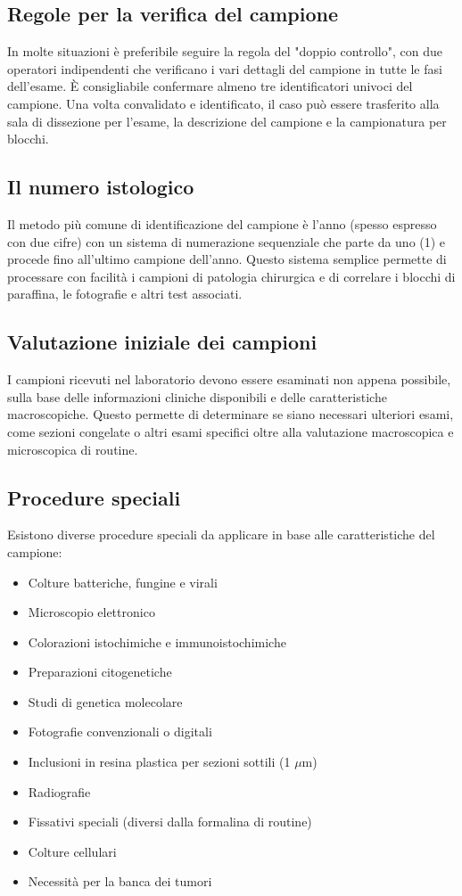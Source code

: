 \subsection{Regole per la verifica del campione}
In molte situazioni è preferibile seguire la regola del "doppio controllo", con due operatori indipendenti che verificano i vari dettagli del campione in tutte le fasi dell'esame. È consigliabile confermare almeno tre identificatori univoci del campione. Una volta convalidato e identificato, il caso può essere trasferito alla sala di dissezione per l'esame, la descrizione del campione e la campionatura per blocchi.

\subsection{Il numero istologico}
Il metodo più comune di identificazione del campione è l'anno (spesso espresso con due cifre) con un sistema di numerazione sequenziale che parte da uno (1) e procede fino all'ultimo campione dell'anno. Questo sistema semplice permette di processare con facilità i campioni di patologia chirurgica e di correlare i blocchi di paraffina, le fotografie e altri test associati.



\subsection{Valutazione iniziale dei campioni}
I campioni ricevuti nel laboratorio devono essere esaminati non appena possibile, sulla base delle informazioni cliniche disponibili e delle caratteristiche macroscopiche. Questo permette di determinare se siano necessari ulteriori esami, come sezioni congelate o altri esami specifici oltre alla valutazione macroscopica e microscopica di routine.

\subsection{Procedure speciali}
Esistono diverse procedure speciali da applicare in base alle caratteristiche del campione:
\begin{itemize}
    \item Colture batteriche, fungine e virali
    \item Microscopio elettronico
    \item Colorazioni istochimiche e immunoistochimiche
    \item Preparazioni citogenetiche
    \item Studi di genetica molecolare
    \item Fotografie convenzionali o digitali
    \item Inclusioni in resina plastica per sezioni sottili (1 $\mu$m)
    \item Radiografie
    \item Fissativi speciali (diversi dalla formalina di routine)
    \item Colture cellulari
    \item Necessità per la banca dei tumori
\end{itemize}


